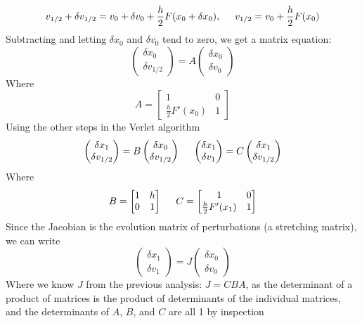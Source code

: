 \documentclass[12pt]{article}
\begin{document}
$$v_{1/2}+\delta v_{1/2}=v_0+\delta v_0+\frac{h}{2}F(x_0+\delta x_0),\hspace{5mm}v_{1/2}=v_0+\frac{h}{2}F(x_0)$$
Subtracting and letting $\delta x_0$ and $\delta v_0$ tend to zero, we get a matrix equation:
$$\begin{pmatrix}
\delta x_0\\
\delta v_{1/2}
\end{pmatrix}=A\begin{pmatrix}
\delta x_0\\
\delta v_0
\end{pmatrix}$$
Where
$$A=\begin{bmatrix}
1&0\\
\frac{h}{2}F'(x_0)&1
\end{bmatrix}$$
Using the other steps in the Verlet algorithm
$$\begin{pmatrix}
\delta x_1\\
\delta v_{1/2}
\end{pmatrix}=B\begin{pmatrix}
\delta x_0\\
\delta v_{1/2}
\end{pmatrix}\hspace{5mm}\begin{pmatrix}
\delta x_1\\
\delta v_1
\end{pmatrix}=C\begin{pmatrix}
\delta x_1\\
\delta v_{1/2}
\end{pmatrix}$$
Where
$$B=\begin{bmatrix}
1&h\\
0&1
\end{bmatrix}\hspace{5mm}C=\begin{bmatrix}
1&0\\
\frac{h}{2}F'(x_1)&1
\end{bmatrix}$$
Since the Jacobian is the evolution matrix of perturbations (a stretching matrix), we can write
$$\begin{pmatrix}
\delta x_1\\
\delta v_1
\end{pmatrix}=J\begin{pmatrix}
\delta x_0\\
\delta v_0
\end{pmatrix}$$
Where we know $J$ from the previous analysis: $J=CBA$, as the determinant of a product of matrices is the product of determinants of the individual matrices, and the determinants of $A$, $B$, and $C$ are all 1 by inspection
\end{document}
